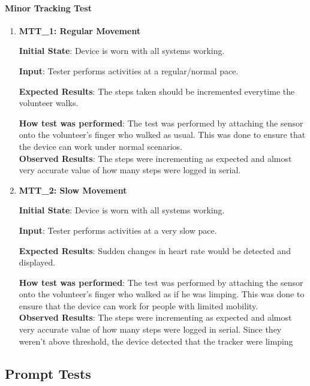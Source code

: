 \documentclass[12pt, titlepage]{article}
\begin{document}
\paragraph{Minor Tracking Test}
\begin{enumerate}
  \item{\textbf{MTT\_1: Regular Movement} \\}\label{MTT1}

  \textbf{Initial State}: Device is worn with all systems working.

  \textbf{Input}: Tester performs activities at a regular/normal pace.

  \textbf{Expected Results}: The steps taken should be incremented everytime the volunteer walks.

  \textbf{How test was performed}: The test was performed by attaching the sensor onto the volunteer's finger who walked as usual. This was done to ensure that the device can work under normal scenarios.\\

  \textbf{Observed Results}: The steps were incrementing as expected and almost very accurate value of how many steps were logged in serial.

  \item{\textbf{MTT\_2: Slow Movement} \\}\label{MTT2}

  \textbf{Initial State}: Device is worn with all systems working.

  \textbf{Input}: Tester performs activities at a very slow pace.

  \textbf{Expected Results}: Sudden changes in heart rate would be detected and displayed.

  \textbf{How test was performed}: The test was performed by attaching the sensor onto the volunteer's finger who walked as if he was limping. This was done to ensure that the device can work for people with limited mobility.\\

  \textbf{Observed Results}: The steps were incrementing as expected and almost very accurate value of how many steps were logged in serial. Since they weren't above threshold, the device detected that the tracker were limping

\end{enumerate}
\subsection{Prompt Tests}
\end{document}
